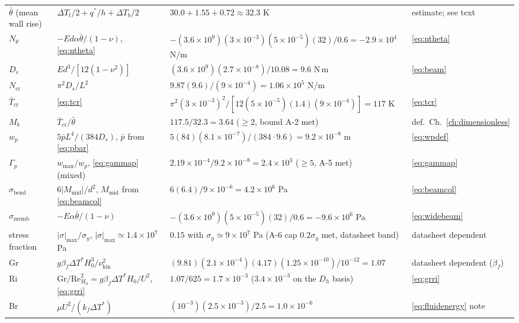 \begin{longtable}{p{3.0cm}p{3.4cm}p{4.2cm}p{2.6cm}}
$\bar\theta$ (mean wall rise) & $\Delta T_t/2+q^{''}/h+\Delta T_b/2$ & $30.0+1.55+0.72\approx32.3$ K & estimate; see text \\
$N_\theta$ & $-Ed\alpha\bar\theta/(1-\nu)$, \eqref{eq:ntheta} & $-(3.6\times10^9)(3\times10^{-3})(5\times10^{-5})(32)/0.6=-2.9\times10^4$ N/m & \eqref{eq:ntheta} \\
$D_s$ & $Ed^3/[12(1-\nu^2)]$ & $(3.6\times10^9)(2.7\times10^{-8})/10.08=9.6$ N\,m & \eqref{eq:beam} \\
$N_{\mathrm{cr}}$ & $\pi^2D_s/L^2$ & $9.87(9.6)/(9\times10^{-4})=1.06\times10^5$ N/m & \cite{timoshenko1961stability} \\
$\bar T_{\mathrm{cr}}$ & \eqref{eq:tcr} & $\pi^2(3\times10^{-3})^2/[12(5\times10^{-5})(1.4)(9\times10^{-4})]=117$ K & \eqref{eq:tcr} \\
$M_b$ & $\bar T_{\mathrm{cr}}/\bar\theta$ & $117.5/32.3=3.64$ ($\ge2$, bound A-2 met) & def.\ Ch.~\ref{ch:dimensionless} \\
$w_p$ & $5\bar pL^4/(384D_s)$, $\bar p$ from \eqref{eq:pbar} & $5(84)(8.1\times10^{-7})/(384\cdot9.6)=9.2\times10^{-8}$ m & \eqref{eq:wpdef} \\
$\Gamma_p$ & $w_{\max}/w_p$, \eqref{eq:gammap} (mixed) & $2.19\times10^{-4}/9.2\times10^{-8}=2.4\times10^{3}$ ($\ge5$, A-5 met) & \eqref{eq:gammap} \\
$\sigma_{\mathrm{bend}}$ & $6|M_{\mathrm{mid}}|/d^2$, $M_{\mathrm{mid}}$ from \eqref{eq:beamcol} & $6(6.4)/9\times10^{-6}=4.2\times10^{6}$ Pa & \eqref{eq:beamcol} \\
$\sigma_{\mathrm{memb}}$ & $-E\alpha\bar\theta/(1-\nu)$ & $-(3.6\times10^9)(5\times10^{-5})(32)/0.6=-9.6\times10^{6}$ Pa & \eqref{eq:widebeam} \\
stress fraction & $|\sigma|_{\max}/\sigma_y$, $|\sigma|_{\max}\simeq1.4\times10^{7}$ Pa & $0.15$ with $\sigma_y\simeq9\times10^7$ Pa (A-6 cap $0.2\sigma_y$ met, datasheet band) & datasheet dependent \\
$\mathrm{Gr}$ & $g\beta_f\Delta T^*H_0^3/\nu_{\mathrm{kin}}^2$ & $(9.81)(2.1\times10^{-4})(4.17)(1.25\times10^{-10})/10^{-12}=1.07$ & datasheet dependent ($\beta_f$) \\
$\mathrm{Ri}$ & $\mathrm{Gr}/\mathrm{Re}_{H_0}^2=g\beta_f\Delta T^*H_0/U^2$, \eqref{eq:grri} & $1.07/625=1.7\times10^{-3}$ ($3.4\times10^{-3}$ on the $D_h$ basis) & \eqref{eq:grri} \\
$\mathrm{Br}$ & $\mu U^2/(k_f\Delta T^*)$ & $(10^{-3})(2.5\times10^{-3})/2.5=1.0\times10^{-6}$ & \eqref{eq:fluidenergy} note \\

\end{longtable}
